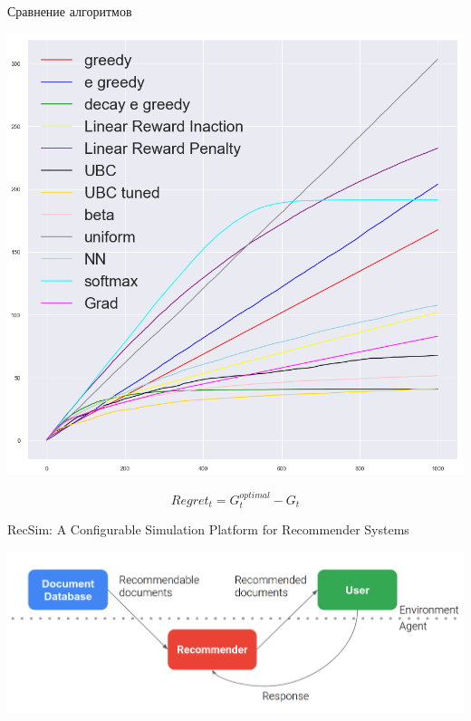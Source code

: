 \documentclass[11pt,aspectratio=169,handout]{beamer}
\begin{document}
\begin{frame}{Сравнение алгоритмов \cite{BANDITS3}}

\begin{center}
\includegraphics[scale=0.2]{images/regret.png}
\end{center}
\[
Regret_t = G_t^{optimal} - G_t
\]

\end{frame}

\begin{frame}{RecSim: A Configurable Simulation Platform for Recommender Systems \cite{RECSIM}}

\begin{center}
\includegraphics[scale=0.2]{images/recsim.png}
\end{center}

\end{frame}
\end{document}
